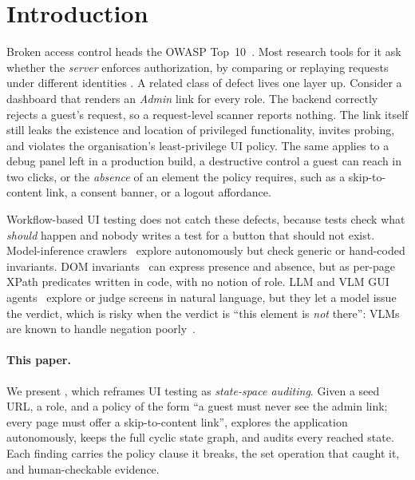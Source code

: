 \section{Introduction}
\label{sec:intro}


Broken access control heads the OWASP Top~10~\cite{owasp2021a01}. Most
research tools for it ask whether the \emph{server} enforces authorization,
by comparing or replaying requests under different identities
\cite{sun2011static,li2014blackbox,noseevich2011detecting,monshizadeh2014mace,liu2025bacscan}.
A related class of defect lives one layer up. Consider a dashboard that
renders an \emph{Admin} link for every role. The backend correctly rejects a
guest's request, so a request-level scanner reports nothing. The link itself
still leaks the existence and location of privileged functionality, invites
probing, and violates the organisation's least-privilege UI policy. The same
applies to a debug panel left in a production build, a destructive control a
guest can reach in two clicks, or the \emph{absence} of an element the policy
requires, such as a skip-to-content link, a consent banner, or a logout
affordance.

Workflow-based UI testing does not catch these defects, because tests check
what \emph{should} happen and nobody writes a test for a button that should
not exist. Model-inference crawlers~\cite{mesbah2012crawljax,memon2003ripping,dallmeier2013webmate}
explore autonomously but check generic or hand-coded invariants. DOM
invariants~\cite{mesbah2012invariant} can express presence and absence, but as
per-page XPath predicates written in code, with no notion of role. LLM and
VLM GUI agents~\cite{liu2024gptdroid,yoon2024droidagent,liu2024visiondroid,zheng2024seeact}
explore or judge screens in natural language, but they let a model issue the
verdict, which is risky when the verdict is ``this element is \emph{not}
there'': VLMs are known to handle negation poorly~\cite{alhamoud2025negation}.

\paragraph{This paper.}
We present \sys{}, which reframes UI testing as \emph{state-space auditing}.
Given a seed URL, a role, and a policy of the form ``a guest must never see the
admin link; every page must offer a skip-to-content link'', \sys{} explores the
application autonomously, keeps the full cyclic state graph, and audits every
reached state. Each finding carries the policy clause it breaks, the set
operation that caught it, and human-checkable evidence.

